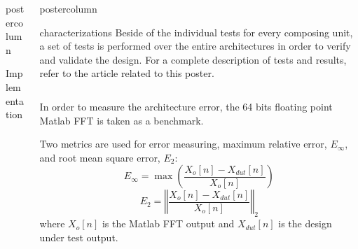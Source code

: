 \documentclass[final]{beamer}
\begin{document}
\begin{frame}{}
\begin{columns}
\begin{column}{.5\textwidth}
\begin{beamercolorbox}[center,wd=0.9\textwidth]{postercolumn}
\begin{minipage}[T]{.99\textwidth}
{\begin{block}{Implementation}
	    \end{block}

      }
      \end{minipage}
   \end{beamercolorbox}
\end{column}




\begin{column}{.5\textwidth}
   \begin{beamercolorbox}[center,wd=\textwidth]{postercolumn}
      \begin{minipage}[T]{.99\textwidth}
      \parbox[t][105cm]{\textwidth}{

		\begin{block}{characterizations}
		\justify
			Beside of the individual tests for every composing unit, a set of tests is performed over the entire architectures in order to verify and validate the design.
			For a complete description of tests and results, refer to the article related to this poster.
			
			\begin{column}{.37\textwidth}
				In order to measure the architecture error, the 64 bits floating point Matlab FFT is taken as a benchmark.

				Two metrics are used for error measuring, maximum relative error, $E_\infty$, and root mean square error, $E_2$:
				\begin{equation}
				E_\infty = \max\left(\frac{ X_o[n] - X_{dut}[n]}{X_o[n]}\right)
				\label{eq:norma1}
				\end{equation}
				\begin{equation}
				E_2 = \left\Vert\frac{X_o[n] - X_{dut}[n]}{X_o[n]}\right\Vert_2
				\label{eq:norma2}
				\end{equation}
				where $X_o[n]$ is the Matlab FFT output and $X_{dut}[n]$ is the design under test output.
				

\end{column}
\end{block}}
\end{minipage}
\end{beamercolorbox}
\end{column}
\end{columns}
\end{frame}
\end{document}
